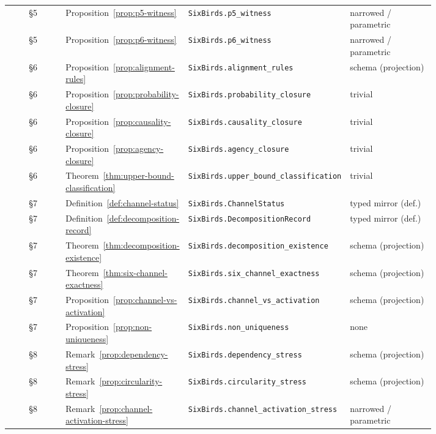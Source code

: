 {\begin{longtable}{@{}c >{\raggedright\arraybackslash}p{0.27\linewidth} >{\raggedright\arraybackslash}p{0.34\linewidth} >{\raggedright\arraybackslash}p{0.20\linewidth}@{}}
§5 & Proposition~\ref{prop:p5-witness} & \texttt{SixBirds.\allowbreak p5\_\allowbreak witness} & narrowed / parametric \\
§5 & Proposition~\ref{prop:p6-witness} & \texttt{SixBirds.\allowbreak p6\_\allowbreak witness} & narrowed / parametric \\
§6 & Proposition~\ref{prop:alignment-rules} & \texttt{SixBirds.\allowbreak alignment\_\allowbreak rules} & schema (projection) \\
§6 & Proposition~\ref{prop:probability-closure} & \texttt{SixBirds.\allowbreak probability\_\allowbreak closure} & trivial \\
§6 & Proposition~\ref{prop:causality-closure} & \texttt{SixBirds.\allowbreak causality\_\allowbreak closure} & trivial \\
§6 & Proposition~\ref{prop:agency-closure} & \texttt{SixBirds.\allowbreak agency\_\allowbreak closure} & trivial \\
§6 & Theorem~\ref{thm:upper-bound-classification} & \texttt{SixBirds.\allowbreak upper\_\allowbreak bound\_\allowbreak classification} & trivial \\
§7 & Definition~\ref{def:channel-status} & \texttt{SixBirds.\allowbreak ChannelStatus} & typed mirror (def.) \\
§7 & Definition~\ref{def:decomposition-record} & \texttt{SixBirds.\allowbreak DecompositionRecord} & typed mirror (def.) \\
§7 & Theorem~\ref{thm:decomposition-existence} & \texttt{SixBirds.\allowbreak decomposition\_\allowbreak existence} & schema (projection) \\
§7 & Theorem~\ref{thm:six-channel-exactness} & \texttt{SixBirds.\allowbreak six\_\allowbreak channel\_\allowbreak exactness} & schema (projection) \\
§7 & Proposition~\ref{prop:channel-vs-activation} & \texttt{SixBirds.\allowbreak channel\_\allowbreak vs\_\allowbreak activation} & schema (projection) \\
§7 & Proposition~\ref{prop:non-uniqueness} & \texttt{SixBirds.\allowbreak non\_\allowbreak uniqueness} & none \\
§8 & Remark~\ref{prop:dependency-stress} & \texttt{SixBirds.\allowbreak dependency\_\allowbreak stress} & schema (projection) \\
§8 & Remark~\ref{prop:circularity-stress} & \texttt{SixBirds.\allowbreak circularity\_\allowbreak stress} & schema (projection) \\
§8 & Remark~\ref{prop:channel-activation-stress} & \texttt{SixBirds.\allowbreak channel\_\allowbreak activation\_\allowbreak stress} & narrowed / parametric \\

\end{longtable}}
